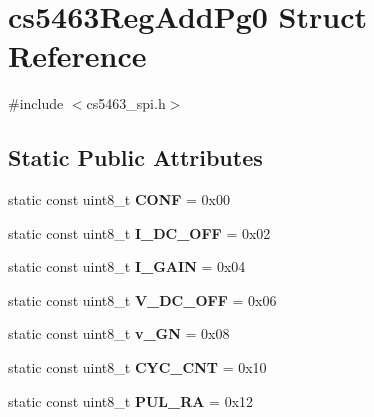 \hypertarget{structcs5463RegAddPg0}{\section{cs5463\-Reg\-Add\-Pg0 Struct Reference}
\label{structcs5463RegAddPg0}
}


{\ttfamily \#include $<$cs5463\-\_\-spi.\-h$>$}

\subsection*{Static Public Attributes}
\begin{DoxyCompactItemize}
\item 
\hypertarget{structcs5463RegAddPg0_a96db3535982766f8f926d47eb61530b0}{static const uint8\-\_\-t {\bfseries C\-O\-N\-F} = 0x00}\label{structcs5463RegAddPg0_a96db3535982766f8f926d47eb61530b0}

\item 
\hypertarget{structcs5463RegAddPg0_a10c2a4661b7a2747e12904b98325de5c}{static const uint8\-\_\-t {\bfseries I\-\_\-\-D\-C\-\_\-\-O\-F\-F} = 0x02}\label{structcs5463RegAddPg0_a10c2a4661b7a2747e12904b98325de5c}

\item 
\hypertarget{structcs5463RegAddPg0_a6671c173e3dc645b7d41dcacdc935331}{static const uint8\-\_\-t {\bfseries I\-\_\-\-G\-A\-I\-N} = 0x04}\label{structcs5463RegAddPg0_a6671c173e3dc645b7d41dcacdc935331}

\item 
\hypertarget{structcs5463RegAddPg0_a474ffd4be604f8aa2efd659eb71ee257}{static const uint8\-\_\-t {\bfseries V\-\_\-\-D\-C\-\_\-\-O\-F\-F} = 0x06}\label{structcs5463RegAddPg0_a474ffd4be604f8aa2efd659eb71ee257}

\item 
\hypertarget{structcs5463RegAddPg0_a1528fb5c5558440bde29653680c84679}{static const uint8\-\_\-t {\bfseries v\-\_\-\-G\-N} = 0x08}\label{structcs5463RegAddPg0_a1528fb5c5558440bde29653680c84679}

\item 
\hypertarget{structcs5463RegAddPg0_a44cf99c1cca4f9a2db501fe66c64b344}{static const uint8\-\_\-t {\bfseries C\-Y\-C\-\_\-\-C\-N\-T} = 0x10}\label{structcs5463RegAddPg0_a44cf99c1cca4f9a2db501fe66c64b344}

\item 
\hypertarget{structcs5463RegAddPg0_a798e9b1839abd370ff4f5d24b4501995}{static const uint8\-\_\-t {\bfseries P\-U\-L\-\_\-\-R\-A} = 0x12}\label{structcs5463RegAddPg0_a798e9b1839abd370ff4f5d24b4501995}


\end{DoxyCompactItemize}

